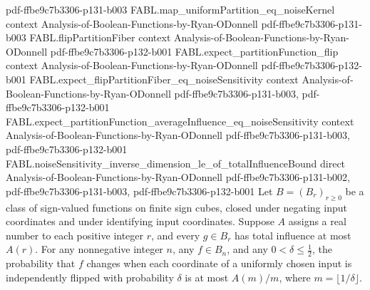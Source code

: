 \begin{theorem}
  {pdf-ffbe9c7b3306-p131-b003}
\proofstep
  {FABL.map_uniformPartition_eq_noiseKernel}
  {context}
  {Analysis-of-Boolean-Functions-by-Ryan-ODonnell}
  {pdf-ffbe9c7b3306-p131-b003}
\proofstep
  {FABL.flipPartitionFiber}
  {context}
  {Analysis-of-Boolean-Functions-by-Ryan-ODonnell}
  {pdf-ffbe9c7b3306-p132-b001}
\proofstep
  {FABL.expect_partitionFunction_flip}
  {context}
  {Analysis-of-Boolean-Functions-by-Ryan-ODonnell}
  {pdf-ffbe9c7b3306-p132-b001}
\proofstep
  {FABL.expect_flipPartitionFiber_eq_noiseSensitivity}
  {context}
  {Analysis-of-Boolean-Functions-by-Ryan-ODonnell}
  {pdf-ffbe9c7b3306-p131-b003,
    pdf-ffbe9c7b3306-p132-b001}
\proofstep
  {FABL.expect_partitionFunction_averageInfluence_eq_noiseSensitivity}
  {context}
  {Analysis-of-Boolean-Functions-by-Ryan-ODonnell}
  {pdf-ffbe9c7b3306-p131-b003,
    pdf-ffbe9c7b3306-p132-b001}
\proofstep
  {FABL.noiseSensitivity_inverse_dimension_le_of_totalInfluenceBound}
  {direct}
  {Analysis-of-Boolean-Functions-by-Ryan-ODonnell}
  {pdf-ffbe9c7b3306-p131-b002,
    pdf-ffbe9c7b3306-p131-b003,
    pdf-ffbe9c7b3306-p132-b001}
Let $B=(B_r)_{r\geq0}$ be a class of sign-valued functions on finite sign cubes, closed
under negating input coordinates and under identifying input coordinates. Suppose $A$
assigns a real number to each positive integer $r$, and every $g\in B_r$ has total
influence at most $A(r)$. For any nonnegative integer $n$, any $f\in B_n$, and any
$0<\delta\leq\tfrac12$, the probability that $f$ changes when each coordinate of a
uniformly chosen input is independently flipped with probability $\delta$ is at most
$A(m)/m$, where $m=\lfloor1/\delta\rfloor$.
\end{theorem}

